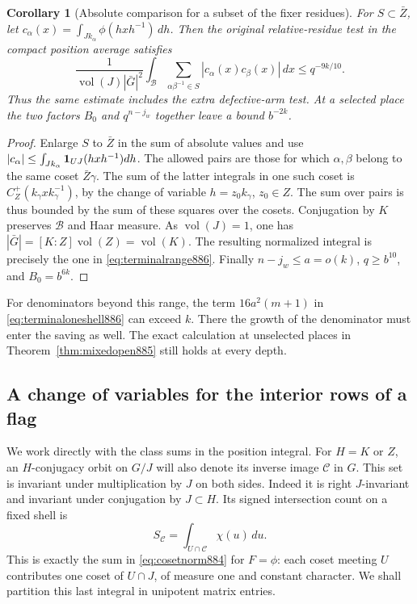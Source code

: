 \documentclass[a4paper,11pt]{article}
\newtheorem{corollary}[proposition]{Corollary}
\theoremstyle{definition}
\theoremstyle{remark}
\numberwithin{equation}{section}
\begin{document}
\begin{corollary}[Absolute comparison for a subset of the fixer residues]
\leavevmode\label{cor:terminalmask886}
For \(S\subset\bar Z\), let
\(c_\alpha(x)=\int_{Jk_\alpha}\phi(hxh^{-1})\,dh\).
Then the original relative-residue test in the compact position
average satisfies
\[
 \frac{1}{\operatorname{vol}(J)|\bar G|^2}
 \int_{\mathcal B}
      \sum_{\alpha\beta^{-1}\in S}|c_\alpha(x)c_\beta(x)|\,dx
        \le q^{-9k/10}.
\]
Thus the same estimate includes the extra defective-arm test.
At a selected place the two factors \(B_0\) and \(q^{n-j_w}\)
together leave a bound \(b^{-2k}\).
\end{corollary}
\begin{proof}
Enlarge \(S\) to \(\bar Z\) in the sum of absolute values and use
\(|c_\alpha|\le\int_{J k_\alpha}{\bf1}_{UJ}(hxh^{-1})dh\).
The allowed pairs are those for which \(\alpha,\beta\) belong
to the same coset \(\bar Z\gamma\). The sum of the latter
integrals in one such coset is
\(C_Z^+(k_\gamma xk_\gamma^{-1})\), by the change of variable
\(h=z_0 k_\gamma\), \(z_0\in Z\). The sum over pairs is thus
bounded by the sum of these squares over the cosets.
Conjugation by \(K\) preserves \(\mathcal B\) and Haar measure.
As \(\operatorname{vol}(J)=1\), one has
\(|\bar G|=[K:Z]\operatorname{vol}(Z)=\operatorname{vol}(K)\).
The resulting normalized integral is precisely the one in
\eqref{eq:terminalrange886}. Finally \(n-j_w\le a=o(k)\),
\(q\ge b^{10}\), and \(B_0=b^{6k}\).
\end{proof}

For denominators beyond this range, the term \(16a^2(m+1)\)
in \eqref{eq:terminaloneshell886} can exceed \(k\).
There the growth of the denominator must enter the saving as
well. The exact calculation at unselected places in
Theorem~\ref{thm:mixedopen885} still holds at every depth.
\clearpage

\subsection{A change of variables for the interior rows of a flag}
\label{sec:armshear887}

We work directly with the class sums in the position integral.
For \(H=K\) or \(Z\), an \(H\)-conjugacy orbit on \(G/J\) will
also denote its inverse image \(\mathcal C\) in \(G\). This set
is invariant under multiplication by \(J\) on both sides.
Indeed it is right \(J\)-invariant and invariant under conjugation
by \(J\subset H\). Its signed intersection count on a fixed shell is
\[
              S_{\mathcal C}=\int_{U\cap\mathcal C}\chi(u)\,du .
\]
This is exactly the sum in \eqref{eq:cosetnorm884} for \(F=\phi\):
each coset meeting \(U\) contributes one coset of \(U\cap J\),
of measure one and constant character. We shall partition this
last integral in unipotent matrix entries.
\end{document}
